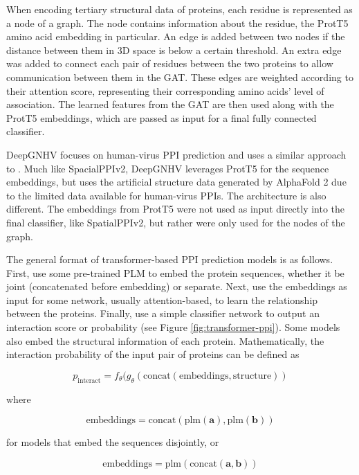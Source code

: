 \documentclass{article}
\begin{document}
When encoding tertiary structural data of proteins, each residue is represented as a node of a graph. The node contains information about the residue, the ProtT5 amino acid embedding in particular. An edge is added between two nodes if the distance between them in 3D space is below a certain threshold. An extra edge was added to connect each pair of residues between the two proteins to allow communication between them in the GAT. These edges are weighted according to their attention score, representing their corresponding amino acids' level of association. The learned features from the GAT are then used along with the ProtT5 embeddings, which are passed as input for a final fully connected classifier.

DeepGNHV \citep{jiang_graph_2025} focuses on human-virus PPI prediction and uses a similar approach to \citet{hu_spatialppiv2_2025}. Much like SpacialPPIv2, DeepGNHV leverages ProtT5 for the sequence embeddings, but uses the artificial structure data generated by AlphaFold 2 \citep{jumper_highly_2021} due to the limited data available for human-virus PPIs. The architecture is also different. The embeddings from ProtT5 were not used as input directly into the final classifier, like SpatialPPIv2, but rather were only used for the nodes of the graph.

The general format of transformer-based PPI prediction models is as follows. First, use some pre-trained PLM to embed the protein sequences, whether it be joint (concatenated before embedding) or separate. Next, use the embeddings as input for some network, usually attention-based, to learn the relationship between the proteins. Finally, use a simple classifier network to output an interaction score or probability (see Figure \ref{fig:transformer-ppi}). Some models also embed the structural information of each protein. Mathematically, the interaction probability of the input pair of proteins can be defined as

\[p_{\text{interact}} = f_\theta(g_\theta(\text{concat}(\text{embeddings}, \text{structure}))\]

where

\[\text{embeddings} = \text{concat}(\text{plm}(\mathbf{a}), \text{plm}(\mathbf{b}))\]

for models that embed the sequences disjointly, or

\[\text{embeddings} = \text{plm}(\text{concat}(\mathbf{a}, \mathbf{b}))\]
\end{document}
